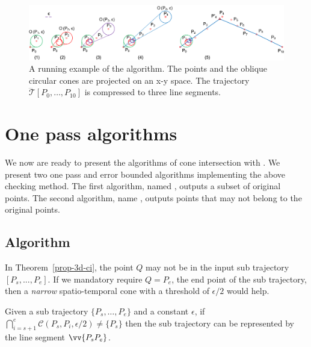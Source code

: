 
\begin{figure}[tb!]
\centering
\includegraphics[scale=0.8]{figures/Fig-conesta.png}
\vspace{-1ex}
\caption{\small A running example of the \cista algorithm. The points and the oblique circular cones are projected on an x-y space. The trajectory $\dddot{\mathcal{T}}[P_0, \ldots, P_{10}]$ is compressed to three line segments.}
\vspace{-2ex}
\label{fig:exm-consta}
\end{figure}


\section{One pass algorithms}
We now are ready to present the algorithms of cone intersection with \sed.
We present two one pass and error bounded algorithms implementing the above \sed checking method.
The first algorithm, named \cist, outputs a subset of original points.
The second algorithm, name \cista, outputs points that may not belong to the original points.





\subsection{{Algorithm \cist}}
In Theorem~\ref{prop-3d-ci}, the point $Q$ may not be in the input sub trajectory $[P_s,...,P_e]$.
If we mandatory require $Q=P_e$, the end point of the sub trajectory, then a \emph{narrow} spatio-temporal cone with a threshold of $\epsilon/2$ would help.

\begin{theorem}
\label{prop-3d-ci-half}
Given a sub trajectory $\{P_s, \ldots, P_e\}$ and a constant $\epsilon$, if $\bigcap_{i=s+1}^{e}{\mathcal{C}(P_s, P_i, \epsilon/2)} \ne \{P_s\}$ then the sub trajectory can be represented by the line segment $\vv{P_sP_e}$.
\end{theorem}

